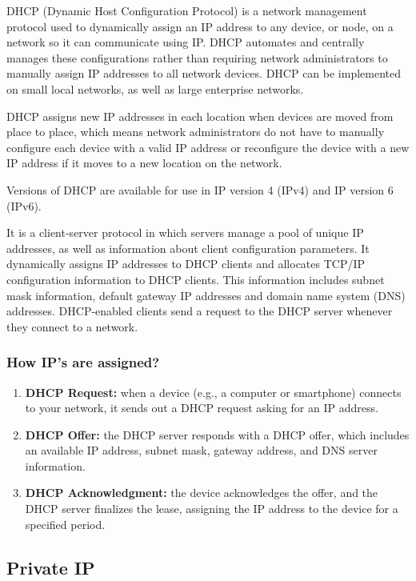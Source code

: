 \documentclass{article}
\begin{document}
DHCP (Dynamic Host Configuration Protocol) is a network management protocol used to dynamically assign an IP address to any device, or node, on a network so it can communicate using IP. DHCP automates and centrally manages these configurations rather than requiring network administrators to manually assign IP addresses to all network devices. DHCP can be implemented on small local networks, as well as large enterprise networks.

DHCP assigns new IP addresses in each location when devices are moved from place to place, which means network administrators do not have to manually configure each device with a valid IP address or reconfigure the device with a new IP address if it moves to a new location on the network.

Versions of DHCP are available for use in IP version 4 (IPv4) and IP version 6 (IPv6).

It is a client-server protocol in which servers manage a pool of unique IP addresses, as well as information about client configuration parameters.  It dynamically assigns IP addresses to DHCP clients and allocates TCP/IP configuration information to DHCP clients. This information includes subnet mask information, default gateway IP addresses and domain name system (DNS) addresses. DHCP-enabled clients send a request to the DHCP server whenever they connect to a network.

\subsubsection{How IP's are assigned?}

\begin{enumerate}
    \item \textbf{DHCP Request:} when a device (e.g., a computer or smartphone) connects to your network, it sends out a DHCP request asking for an IP address.
    \item \textbf{DHCP Offer:} the DHCP server responds with a DHCP offer, which includes an available IP address, subnet mask, gateway address, and DNS server information.
    \item \textbf{DHCP Acknowledgment:} the device acknowledges the offer, and the DHCP server finalizes the lease, assigning the IP address to the device for a specified period.
\end{enumerate}

\newpage
\subsection{Private IP}
\end{document}
